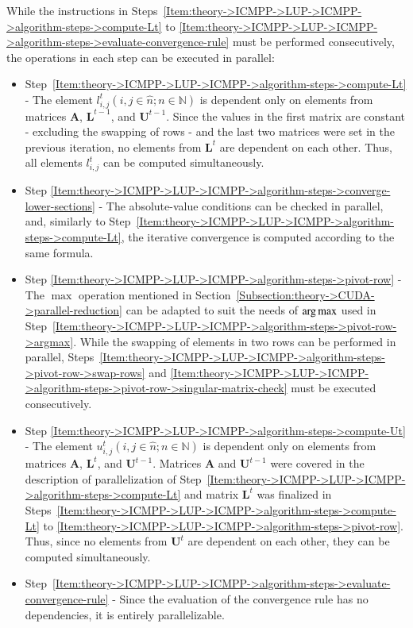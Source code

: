 While the instructions in Steps~\ref{Item:theory->ICMPP->LUP->ICMPP->algorithm-steps->compute-Lt} to \ref{Item:theory->ICMPP->LUP->ICMPP->algorithm-steps->evaluate-convergence-rule} must be performed consecutively, the operations in each step can be executed in parallel:

\begin{itemize}
	\item Step~\ref{Item:theory->ICMPP->LUP->ICMPP->algorithm-steps->compute-Lt} - The element $l^{t}_{i,j} \left(i, j \in \widehat{n}; n \in \mathbb{N}\right)$ is dependent only on elements from matrices $\mathbf{A}$, $\mathbf{L}^{t-1}$, and $\mathbf{U}^{t-1}$.
Since the values in the first matrix are constant - excluding the swapping of rows - and the last two matrices were set in the previous iteration, no elements from $\mathbf{L}^{t}$ are dependent on each other.
Thus, all elements $l^{t}_{i,j}$ can be computed simultaneously.
	\item Step \ref{Item:theory->ICMPP->LUP->ICMPP->algorithm-steps->converge-lower-sections} - The absolute-value conditions can be checked in parallel, and, similarly to Step~\ref{Item:theory->ICMPP->LUP->ICMPP->algorithm-steps->compute-Lt}, the iterative convergence is computed according to the same formula.
	\item Step \ref{Item:theory->ICMPP->LUP->ICMPP->algorithm-steps->pivot-row} - The $\max$ operation mentioned in Section~\ref{Subsection:theory->CUDA->parallel-reduction} can be adapted to suit the needs of $\operatorname*{arg\,max}$ used in Step~\ref{Item:theory->ICMPP->LUP->ICMPP->algorithm-steps->pivot-row->argmax}.
While the swapping of elements in two rows can be performed in parallel, Steps~\ref{Item:theory->ICMPP->LUP->ICMPP->algorithm-steps->pivot-row->swap-rows} and \ref{Item:theory->ICMPP->LUP->ICMPP->algorithm-steps->pivot-row->singular-matrix-check} must be executed consecutively.
	\item Step \ref{Item:theory->ICMPP->LUP->ICMPP->algorithm-steps->compute-Ut} - The element $u^{t}_{i,j} \left(i, j \in \widehat{n}; n \in \mathbb{N}\right)$ is dependent only on elements from matrices $\mathbf{A}$, $\mathbf{L}^{t}$, and $\mathbf{U}^{t-1}$.
Matrices $\mathbf{A}$ and $\mathbf{U}^{t-1}$ were covered in the description of parallelization of Step~\ref{Item:theory->ICMPP->LUP->ICMPP->algorithm-steps->compute-Lt} and matrix $\mathbf{L}^{t}$ was finalized in Steps~\ref{Item:theory->ICMPP->LUP->ICMPP->algorithm-steps->compute-Lt} to \ref{Item:theory->ICMPP->LUP->ICMPP->algorithm-steps->pivot-row}.
Thus, since no elements from $\mathbf{U}^{t}$ are dependent on each other, they can be computed simultaneously.
	\item Step~\ref{Item:theory->ICMPP->LUP->ICMPP->algorithm-steps->evaluate-convergence-rule} - Since the evaluation of the convergence rule has no dependencies, it is entirely parallelizable.
\end{itemize}

